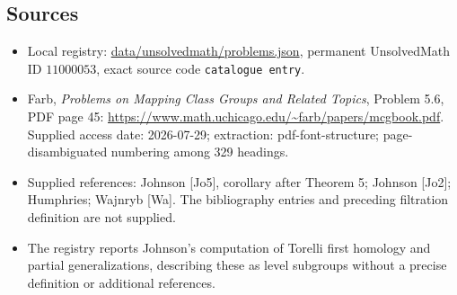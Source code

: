 \documentclass[11pt]{article}
\begin{document}
\subsection{Sources}
\begin{itemize}
\item Local registry: \url{data/unsolvedmath/problems.json}, permanent UnsolvedMath ID $11000053$, exact source code \texttt{catalogue entry}.
\item Farb, \emph{Problems on Mapping Class Groups and Related Topics}, Problem 5.6, PDF page 45: \url{https://www.math.uchicago.edu/~farb/papers/mcgbook.pdf}. Supplied access date: 2026-07-29; extraction: pdf-font-structure; page-disambiguated numbering among 329 headings.
\item Supplied references: Johnson [Jo5], corollary after Theorem 5; Johnson [Jo2]; Humphries; Wajnryb [Wa]. The bibliography entries and preceding filtration definition are not supplied.
\item The registry reports Johnson's computation of Torelli first homology and partial generalizations, describing these as level subgroups without a precise definition or additional references.
\end{itemize}
\end{document}

